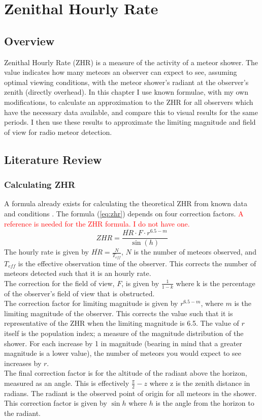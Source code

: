 \chapter{Zenithal Hourly Rate}
\section{Overview}
Zenithal Hourly Rate (ZHR) is a measure of the activity of a meteor shower. The value indicates how many meteors an observer can expect to see, assuming optimal viewing conditions, with the meteor shower's radiant at the observer's zenith (directly overhead). In this chapter I use known formulae, with my own modifications, to calculate an approximation to the ZHR for all observers which have the necessary data available, and compare this to visual results for the same periods. I then use these results to approximate the limiting magnitude and field of view for radio meteor detection.
\section{Literature Review}
\subsection{Calculating ZHR}
A formula already exists for calculating the theoretical ZHR from known data and conditions \cite{zhr}. The formula (\ref{eq:zhr}) depends on four correction factors. 
\textcolor{red}{A reference is needed for the ZHR formula. I do not have one.}
\begin{equation}{ZHR} = \frac{\overline{HR} \cdot F \cdot r^{6.5-{m}}}{\sin \left( h \right)}\label{eq:zhr} \end{equation}
The hourly rate is given by $\overline{HR} = \frac{N}{T_{eff}}$, $N$ is the number of meteors observed, and $T_{eff}$ is the effective observation time of the observer. This corrects the number of meteors detected such that it is an hourly rate. \\
The correction for the field of view, $F$, is given by $\frac{1}{1-k}$ where k is the percentage of the observer's field of view that is obstructed. \\
The correction factor for limiting magnitude is given by $r^{6.5-m}$, where $m$ is the limiting magnitude of the observer. This corrects the value such that it is representative of the ZHR when the limiting magnitude is 6.5.  The value of $r$ itself is the population index; a measure of the magnitude distribution of the shower. For each increase by 1 in magnitude (bearing in mind that a greater magnitude is a lower value), the number of meteors you would expect to see increases by $r$.\\
The final correction factor is for the altitude of the radiant above the horizon, measured as an angle. This is effectively $\frac{\pi}{2}-z$ where z is the zenith distance in radians. The radiant is the observed point of origin for all meteors in the shower. This correction factor is given by $\sin h$ where $h$ is the angle from the horizon to the radiant.\\
